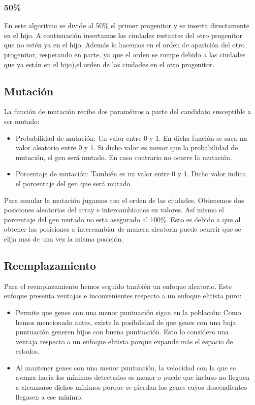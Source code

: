 \documentclass{article}
\begin{document}
\subsubsection{50\%}
En este algoritmo se divide al 50\% el primer progenitor y se inserta directamente en el hijo. A continuación insertamos 
las ciudades restantes del otro progenitor que no estén ya en el hijo. Además lo hacemos en el orden de aparición del otro 
progenitor, respetando en parte, ya que el orden se rompe debido a las ciudades que ya están en el hijo),el orden de las ciudades 
en el otro progenitor.  

\subsection{Mutación}
La función de mutación recibe dos paramétros a parte del candidato susceptible a ser mutado:
\begin{itemize}
    \item Probabilidad de mutación: Un valor entre 0 y 1. En dicha función se saca un valor aleatorio entre 0 y 1. Si dicho valor 
    es menor que la probabilidad de mutación, el gen será mutado. En caso contrario no ocurre la mutación. 
    \item Porcentaje de mutación: También es un valor entre 0 y 1. Dicho valor indica el porcentaje del gen que será mutado. 
\end{itemize}
    Para simular la mutación jugamos con el orden de las ciudades. Obtenemos dos posiciones aleatorias del array e intercambiamos 
    su valores. Así mismo el porcentaje del gen mutado no esta asegurado al 100\%. Esto es debido a que al obtener las posiciones 
    a intercambiar de manera aleatoria puede ocurrir que se elija mas de una vez la misma posición. 

\subsection{Reemplazamiento}
    Para el reemplazamiento hemos seguido también un enfoque aleatorio. Este enfoque presenta ventajas e inconvenientes 
    respecto a un enfoque elitista puro:
    \begin{itemize}
        \item Permite que genes con una menor puntuación sigan en la población: Como hemos mencionado antes, existe la 
        posibilidad de que genes con una baja puntuación generen hijos con buena puntuación. Esto lo considero una ventaja 
        respecto a un enfoque elitista porque expande más el espacio de estados.  
        \item Al mantener genes con una menor puntuación, la velocidad con la que se avanza hacia los mínimos detectados es 
        menor o puede que incluso no lleguen a alcanzarse dichos mínimos porque se pierdan los genes cuyos descendientes 
        llegasen a ese mínimo. 
    \end{itemize}    
\end{document}
